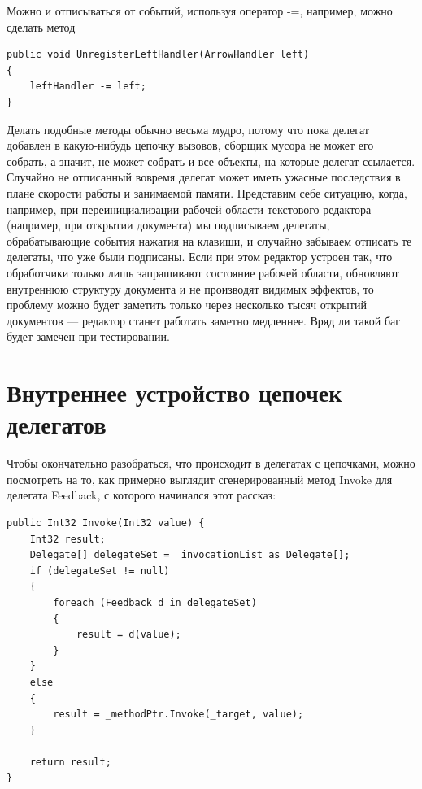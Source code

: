 \documentclass{../../text-style}
\begin{document}
Можно и отписываться от событий, используя оператор -=, например, можно сделать метод 

\begin{verbatim}
public void UnregisterLeftHandler(ArrowHandler left)
{
    leftHandler -= left;
}
\end{verbatim}

Делать подобные методы обычно весьма мудро, потому что пока делегат добавлен в какую-нибудь цепочку вызовов, сборщик мусора не может его собрать, а значит, не может собрать и все объекты, на которые делегат ссылается. Случайно не отписанный вовремя делегат может иметь ужасные последствия в плане скорости работы и занимаемой памяти. Представим себе ситуацию, когда, например, при переинициализации рабочей области текстового редактора (например, при открытии документа) мы подписываем делегаты, обрабатывающие события нажатия на клавиши, и случайно забываем отписать те делегаты, что уже были подписаны. Если при этом редактор устроен так, что обработчики только лишь запрашивают состояние рабочей области, обновляют внутреннюю структуру документа и не производят видимых эффектов, то проблему можно будет заметить только через несколько тысяч открытий документов --- редактор станет работать заметно медленнее. Вряд ли такой баг будет замечен при тестировании.

\section{Внутреннее устройство цепочек делегатов}

Чтобы окончательно разобраться, что происходит в делегатах с цепочками, можно посмотреть на то, как примерно выглядит сгенерированный метод Invoke для делегата Feedback, с которого начинался этот рассказ:

\begin{verbatim}
public Int32 Invoke(Int32 value) {
    Int32 result;
    Delegate[] delegateSet = _invocationList as Delegate[];
    if (delegateSet != null) 
    {
        foreach (Feedback d in delegateSet)
        {
            result = d(value);
        }
    } 
    else 
    {
        result = _methodPtr.Invoke(_target, value);
    }

    return result;
}
\end{verbatim}
\end{document}
